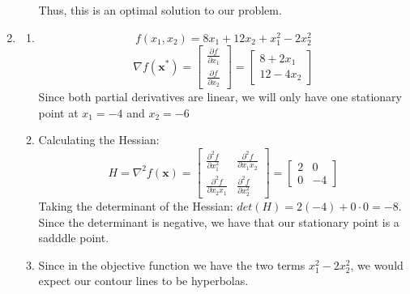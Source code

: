 \documentclass[12pt,english]{article}
\begin{document}
\begin{enumerate}
\begin{enumerate}
        Thus, this is an optimal solution to our problem.  
    \end{enumerate}
    \pagebreak
    \item 
    \begin{enumerate}
        \item 
        $$f(x_1, x_2)  = 8x_1+12x_2+x_1^2-2x_2^2$$
        \[
        \nabla f(\mathbf{x}^*) = 
        \begin{bmatrix}
            \frac{\partial f}{\partial x_1} \\
            \frac{\partial f}{\partial x_2}
        \end{bmatrix}
        =
        \begin{bmatrix}
            8 + 2x_1\\
            12 - 4x_2
        \end{bmatrix}
        \]
        Since both partial derivatives are linear, we will only have one stationary point 
        at $x_1 = -4$ and $x_2 = -6$
        \item 
        Calculating the Hessian: 
        \[
            H = \nabla^2 f(\mathbf{x}) = 
            \begin{bmatrix}
                \frac{\partial^2 f}{\partial x_1^2} & \frac{\partial^2 f}{\partial x_1 x_2}\\
                \frac{\partial^2 f}{\partial x_2 x_1} & \frac{\partial^2 f}{\partial x_2^2}
            \end{bmatrix}
            =
            \begin{bmatrix}
                2 & 0 \\
                0 & -4
            \end{bmatrix}
        \]
        Taking the determinant of the Hessian: $det(H) = 2(-4) + 0\cdot 0 = -8$. Since 
        the determinant is negative, we have that our stationary point is a sadddle point. 
        \item 
        Since in the objective function we have the two terms $x_1^2 - 2x_2^2$, 
        we would expect our contour lines to be hyperbolas. 
    \end{enumerate}
\end{enumerate}
\end{document}
